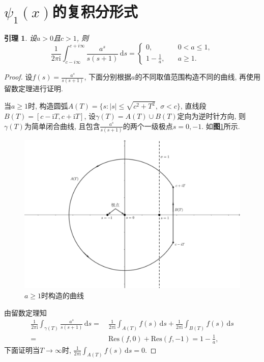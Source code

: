 \documentclass[12pt, a4paper, oneside]{ctexart}
\newtheorem{lemma}{引理}[section]
\numberwithin{equation}{section}  %
\let\leq=\leqslant %
\let\geq=\geqslant %
\def\d{\mathrm{d}}          %
\def\i{\mathrm{i}}          %
\def\res{\mathrm{Res}}      %
\def\add{\vspace{1ex}}      %
\begin{document}
\section{\texorpdfstring{$\psi_1(x)$}{}的复积分形式}
\begin{lemma}\label{le-psi}
    设$a >0$且$c>1$, 则
    \begin{equation*}
        \frac{1}{2\pi \i}\int_{c-i\infty}^{c+i\infty}\frac{a^s}{s(s+1)}\,\d s=\begin{cases}
            0,&\quad0 < a\leq 1,\\
            1-\frac{1}{a},&\quad a \geq 1.
        \end{cases}
    \end{equation*}
\end{lemma}
\begin{proof}
    设$f(s) = \frac{a^s}{s(s+1)}$, 下面分别根据$a$的不同取值范围构造不同的曲线, 再使用留数定理进行证明.
    
    当$a\geq 1$时, 构造圆弧$A(T) = \{s:|s|\leq \sqrt{c^2+T^2},\ \sigma < c\}$, \add 直线段$B(T) = [c-\i T, c+\i T]$, 设$\gamma(T) = A(T) \cup B(T)$定向为逆时针方向, 则$\gamma(T)$为简单闭合曲线, 且包含$\frac{a^s}{s(s+1)}$的两个一级极点$s=0,-1$. 如\textbf{图}\ref{figure-psi1}所示.
    \begin{figure}[htbp] %
        \centering
        \includegraphics[scale=0.5]{引理计算psi1_1.pdf}
        \caption{$a\geq 1$时构造的曲线}
        \label{figure-psi1}
    \end{figure}

    由留数定理知
    \begin{equation}\label{eq-psi1}
        \begin{aligned}
            \frac{1}{2\pi \i}\int_{\gamma(T)}\frac{a^s}{s(s+1)}\,\d s =&\ \frac{1}{2\pi \i}\int_{A(T)}f(s)\,\d s+\frac{1}{2\pi\i}\int_{B(T)}f(s)\,\d s\\
            =&\ \res(f, 0)+\res(f, -1) = 1 - \frac{1}{a},
        \end{aligned}
    \end{equation}
    下面证明当$T\to\infty$时, $\frac{1}{2\pi \i}\int_{A(T)}f(s)\,\d s=0$.\add


\end{proof}
\end{document}
